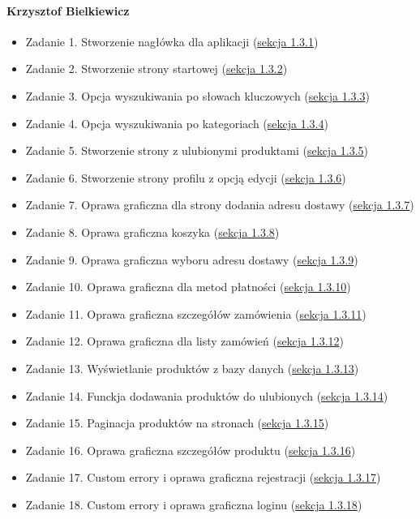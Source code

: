 \documentclass[12pt,a4paper,oneside]{article}
\theoremstyle{definition}
\numberwithin{equation}{section}
\begin{document}
\paragraph{Krzysztof Bielkiewicz}
\begin{itemize}
\item Zadanie 1. Stworzenie nagłówka dla aplikacji (\hyperref[1.3.1]{sekcja 1.3.1})
\item Zadanie 2. Stworzenie strony startowej (\hyperref[1.3.2]{sekcja 1.3.2})
\item Zadanie 3. Opcja wyszukiwania po słowach kluczowych (\hyperref[1.3.3]{sekcja 1.3.3})
\item Zadanie 4. Opcja wyszukiwania po kategoriach (\hyperref[1.3.4]{sekcja 1.3.4})
\item Zadanie 5. Stworzenie strony z ulubionymi produktami (\hyperref[1.3.5]{sekcja 1.3.5})
\item Zadanie 6. Stworzenie strony profilu z opcją edycji (\hyperref[1.3.6]{sekcja 1.3.6})
\item Zadanie 7. Oprawa graficzna dla strony dodania adresu dostawy (\hyperref[1.3.7]{sekcja 1.3.7})
\item Zadanie 8. Oprawa graficzna koszyka (\hyperref[1.3.8]{sekcja 1.3.8})
\item Zadanie 9. Oprawa graficzna wyboru adresu dostawy (\hyperref[1.3.9]{sekcja 1.3.9})
\item Zadanie 10. Oprawa graficzna dla metod płatności (\hyperref[1.3.10]{sekcja 1.3.10})
\item Zadanie 11. Oprawa graficzna szczegółów zamówienia (\hyperref[1.3.11]{sekcja 1.3.11})
\item Zadanie 12. Oprawa graficzna dla listy zamówień (\hyperref[1.3.12]{sekcja 1.3.12})
\item Zadanie 13. Wyświetlanie produktów z bazy danych (\hyperref[1.3.13]{sekcja 1.3.13})
\item Zadanie 14. Funckja dodawania produktów do ulubionych (\hyperref[1.3.14]{sekcja 1.3.14})
\item Zadanie 15. Paginacja produktów na stronach (\hyperref[1.3.15]{sekcja 1.3.15})
\item Zadanie 16. Oprawa graficzna szczegółów produktu (\hyperref[1.3.16]{sekcja 1.3.16})
\item Zadanie 17. Custom errory i oprawa graficzna rejestracji (\hyperref[1.3.17]{sekcja 1.3.17})
\item Zadanie 18. Custom errory i oprawa graficzna loginu (\hyperref[1.3.18]{sekcja 1.3.18})
\end{itemize}
\end{document}

